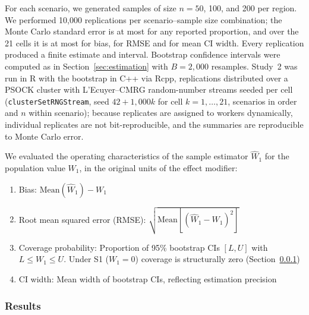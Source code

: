 \documentclass[AMA,Times1COL]{WileyNJDv5}
\begin{document}
For each scenario, we generated samples of size $n = 50$, 100, and 200 per region. We performed 10{,}000 replications per scenario--sample size combination; the Monte Carlo standard error is at most  for any reported proportion, and over the 21 cells it is at most  for bias,  for RMSE and  for mean CI width. Every replication produced a finite estimate and interval. Bootstrap confidence intervals were computed as in Section~\ref{sec:estimation} with $B = 2{,}000$ resamples. Study~2 was run in R with the bootstrap in C++ via Rcpp, replications distributed over a PSOCK cluster with L'Ecuyer--CMRG random-number streams seeded per cell (\texttt{clusterSetRNGStream}, seed $42 + 1{,}000k$ for cell $k = 1, \ldots, 21$, scenarios in order and $n$ within scenario); because replicates are assigned to workers dynamically, individual replicates are not bit-reproducible, and the summaries are reproducible to Monte Carlo error.

We evaluated the operating characteristics of the sample estimator $\widehat{W}_1$ for the population value $W_1$, in the original units of the effect modifier:
\begin{enumerate}[1.]
\item Bias: $\text{Mean}(\widehat{W}_1) - W_1$
\item Root mean squared error (RMSE): $\sqrt{\text{Mean}[(\widehat{W}_1 - W_1)^2]}$
\item Coverage probability: Proportion of 95\% bootstrap CIs $[L, U]$ with $L \le W_1 \le U$. Under S1 ($W_1 = 0$) coverage is structurally zero (Section~\ref{sec:sim_results})
\item CI width: Mean width of bootstrap CIs, reflecting estimation precision
\end{enumerate}

\subsubsection{Results}\label{sec:sim_results}
\end{document}
